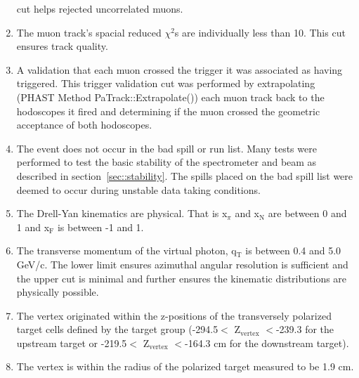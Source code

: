 \begin{enumerate}
  cut helps rejected uncorrelated muons.
\item The muon track's spacial reduced $\chi^2$s are individually less than 10.
  This cut ensures track quality.
\item A validation that each muon crossed the trigger it was associated as
  having triggered.  This trigger validation cut was performed by extrapolating
  (PHAST Method PaTrack::Extrapolate()) each muon track back to the hodoscopes
  it fired and determining if the muon crossed the geometric acceptance of both
  hodoscopes.
\item The event does not occur in the bad spill or run list.  Many tests were
  performed to test the basic stability of the spectrometer and beam as
  described in section~\ref{sec::stability}.  The spills placed on the bad spill
  list were deemed to occur during unstable data taking conditions.
\item The Drell-Yan kinematics are physical.  That is x$_{\pi}$ and
  x$_{\mathrm{N}}$ are between 0 and 1 and x$_{\mathrm{F}}$ is between -1 and 1.
\item The transverse momentum of the virtual photon, q$_{\mathrm{T}}$ is between
  0.4 and 5.0 GeV/c.  The lower limit ensures azimuthal angular resolution is
  sufficient and the upper cut is minimal and further ensures the kinematic
  distributions are physically possible.
\item The vertex originated within the z-positions of the transversely polarized
  target cells defined by the target group (-294.5$<$ Z$_{\mathrm{vertex}}$
  $<$-239.3 for the upstream target or -219.5$<$ Z$_{\mathrm{vertex}}$ $<$-164.3
  cm for the downstream target).
\item The vertex is within the radius of the polarized target measured to be 1.9
  cm.
\end{enumerate}


